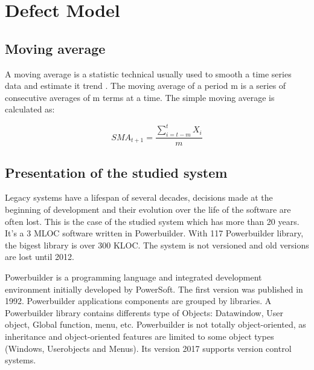 \documentclass[10pt,conference]{IEEEtran}
\begin{document}
\section{Defect Model}\label{sec:defectModel}
\subsection{Moving average}
A moving average is a statistic technical usually used to smooth a time series data and estimate it trend \cite{MOLU17}.
 The moving average of a period m is a series of consecutive averages of m terms at a time. 
 The simple moving average is calculated as:

\begin{equation}
SMA_{t+1}=\frac{\sum\limits_{i=t-m}^t X_i}{m}
\end{equation}
\subsection{Presentation of the studied system}
Legacy systems have a lifespan of several decades, decisions made at the beginning of development and their evolution over the life of the software are often lost. 
This is the case of the studied system  which has more than 20 years. 
It's a 3 MLOC software written in Powerbuilder. With 117 Powerbuilder library, the  bigest library is  over 300 KLOC.
The system is not versioned and old versions are lost until 2012.

Powerbuilder is a programming language and integrated development environment initially developed by PowerSoft. The first version was published in 1992.
Powerbuilder applications components are grouped by libraries.  
A Powerbuilder library contains differents type of Objects: Datawindow, User object, Global function,  menu, etc. 
Powerbuilder is not totally object-oriented, as inheritance and object-oriented features are limited to some object types (Windows, Userobjects and Menus). 
Its version 2017 supports version control systems.%
    
\end{document}
